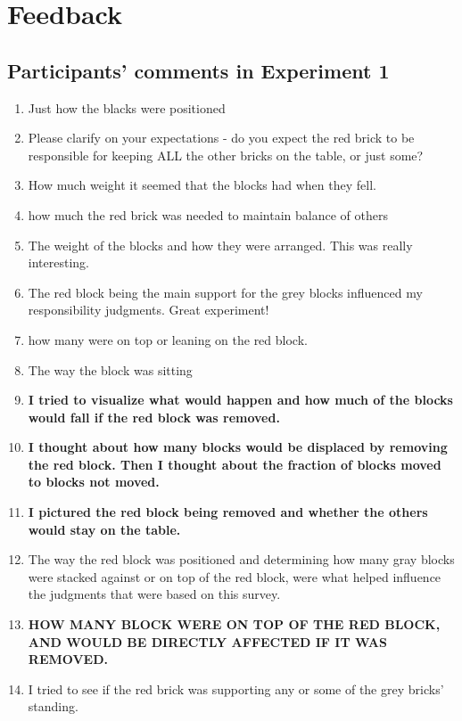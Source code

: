 \documentclass[11pt]{article}
\begin{document}
\clearpage
\appendix 

\section{Feedback}
\label{sec:feedback}

\subsection{Participants' comments in Experiment 1}
\label{sub:experiment_1}

\begin{enumerate}
  \item Just how the blacks were positioned
\item Please clarify on your expectations - do you expect the red brick to be responsible for keeping ALL the other bricks on the table, or just some?
\item How much weight it seemed that the blocks had when they fell. 
\item how much the red brick was needed to maintain balance of others
\item The weight of the blocks and how they were arranged. This was really interesting.
\item The red block being the main support for the grey blocks influenced my responsibility judgments. Great experiment!
\item how many were on top or leaning on the red block. 
\item The way the block was sitting
\item \textbf{I tried to visualize what would happen and how much of the blocks would fall if the red block was removed.}
\item \textbf{I thought about how many blocks would be displaced by removing the red block. Then I thought about the fraction of blocks moved to blocks not moved.}
\item \textbf{I pictured the red block being removed and whether the others would stay on the table.}
\item The way the red block was positioned and determining how many gray blocks were stacked against or on top of the red block, were what helped influence the judgments that were based on this survey.
\item \textbf{HOW MANY BLOCK WERE ON TOP OF THE RED BLOCK, AND WOULD BE DIRECTLY AFFECTED IF IT WAS REMOVED. }
\item I tried to see if the red brick was supporting any or some of the grey bricks' standing.

\end{enumerate}
\end{document}
